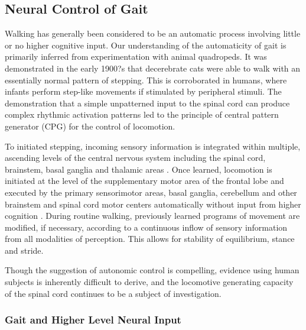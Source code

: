 \documentclass[11pt, oneside]{report}   	%
\begin{document}
\subsection{Neural Control of Gait}

Walking has generally been considered to be an automatic process involving little or no higher cognitive input\cite{Shik1976}. Our understanding of the automaticity of gait is primarily inferred from experimentation with animal quadropeds. It was demonstrated in the early 1900?s that decerebrate cats were able to walk with an essentially normal pattern of stepping\cite{Sherrington1910}. This is corroborated in humans, where infants perform step-like movements if stimulated by peripheral stimuli\cite{Dietz1997}. The demonstration that a simple unpatterned input to the spinal cord can produce complex rhythmic activation patterns led to the principle of central pattern generator (CPG) for the control of locomotion\cite{Mackay-lyons2002}. 

To initiated stepping, incoming sensory information is integrated within multiple, ascending levels of the central nervous system including the spinal cord, brainstem, basal ganglia and thalamic areas \cite{Shik1976, Dietz1997}. Once learned, locomotion is initiated at the level of the supplementary motor area of the frontal lobe and executed by the primary sensorimotor areas, basal ganglia, cerebellum and other brainstem and spinal cord motor centers automatically without input from higher cognition \cite{Shik1976, Dietz1997}. During routine walking, previously learned programs of movement are modified, if necessary, according to a continuous inflow of sensory information from all modalities of perception. This allows for stability of equilibrium, stance and stride\cite{Sheridan2007}. 

Though the suggestion of autonomic control is compelling, evidence using human subjects is inherently difficult to derive, and the locomotive generating capacity of the spinal cord continues to be a subject of investigation\cite{Mackay-lyons2002}.

\subsubsection{Gait and Higher Level Neural Input}
\end{document}
